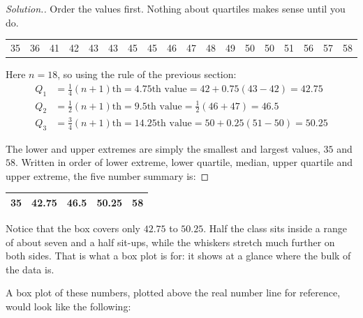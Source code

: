 \documentclass[11pt,a4paper]{article}
\theoremstyle{definition}
\newenvironment{solution}
  {\renewcommand{\qedsymbol}{}\begin{proof}[\textit{Solution}.]}
  {\end{proof}}
\begin{document}
\begin{solution}
Order the values first. Nothing about quartiles makes sense until you do.
\begin{table}[H]
\centering
\begin{tabular}{cccccccccccccccccc}
35 & 36 & 41 & 42 & 43 & 43 & 45 & 45 & 46 & 47 & 48 & 49 & 50 & 50 & 51 & 56 & 57 & 58
\end{tabular}
\end{table}

Here $n=18$, so using the rule of the previous section:
\begin{align*}
Q_1 &=\tfrac{1}{4}(n+1)\text{th}=4.75\text{th value}=42+0.75(43-42)=42.75\\
Q_2 &=\tfrac{1}{2}(n+1)\text{th}=9.5\text{th value}=\tfrac{1}{2}(46+47)=46.5\\
Q_3 &=\tfrac{3}{4}(n+1)\text{th}=14.25\text{th value}=50+0.25(51-50)=50.25
\end{align*}

The lower and upper extremes are simply the smallest and largest values, $35$ and $58$.
Written in order of lower extreme, lower quartile, median, upper quartile and upper
extreme, the five number summary is:
\end{solution}





\begin{table}[H]
\centering
\begin{tabular}{ccccc}
\hline
35 & 42.75 & 46.5 & 50.25 & 58\\
\hline
\end{tabular}
\end{table}

Notice that the box covers only $42.75$ to $50.25$. Half the class sits inside a range of
about seven and a half sit-ups, while the whiskers stretch much further on both sides.
That is what a box plot is for: it shows at a glance where the bulk of the data is.





A box plot of these numbers, plotted above the real number line for reference, would look like the following:
\end{document}
